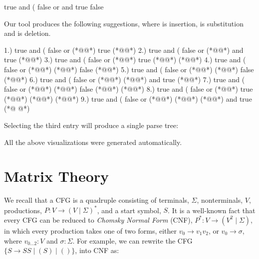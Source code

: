 \documentclass[sigplan,nonacm]{acmart}\settopmatter{printfolios=false,printccs=false,printacmref=false}
\begin{document}
\begin{tidyinput}
true and ( false or and true false
\end{tidyinput}

\noindent Our tool produces the following suggestions, where  is insertion,  is substitution and  is deletion.

\begin{tidyoutput}
1.) true and ( false or (*@\hlorange{!}@*) true (*@\hlorange{)}@*)
2.) true and ( false or (*@@*) and true (*@\hlorange{)}@*)
3.) true and ( false or (*@\hlorange{(}@*) true (*@\hlorange{)}@*) (*@\hlgreen{)}@*)
4.) true and ( false or (*@\hlorange{!}@*) (*@\hlorange{!}@*) false (*@\hlgreen{)}@*)
5.) true and ( false or (*@@*) (*@@*) false (*@\hlgreen{)}@*)
6.) true and ( false or (*@\hlgreen{!}@*) (*@@*) and true (*@\hlorange{)}@*)
7.) true and ( false or (*@\hlorange{!}@*) (*@\hlorange{(}@*) false (*@\hlgreen{)}@*) (*@\hlgreen{)}@*)
8.) true and ( false or (*@\hlorange{!}@*) true (*@\hlorange{)}@*) (*@@*) (*@@*)
9.) true and ( false or (*@\hlgreen{!}@*) (*@@*) (*@\hlgreen{)}@*) and true (*@ @*)
\end{tidyoutput}

\noindent Selecting the third entry will produce a single parse tree:

\begin{figure}[H]
\end{figure}

\noindent All the above visualizations were generated automatically.

\section{Matrix Theory}

We recall that a CFG is a quadruple consisting of terminals, $\Sigma$, nonterminals, $V$, productions, $P: V \rightarrow (V \mid \Sigma)^*$, and a start symbol, $S$. It is a well-known fact that every CFG can be reduced to \textit{Chomsky Normal Form} (CNF), $P^*: V \rightarrow (V^2 \mid \Sigma)$, in which every production takes one of two forms, either $v_0 \rightarrow v_1 v_2$, or $v_0 \rightarrow \sigma$, where $v_{0\ldots2}: V$ and $\sigma: \Sigma$. For example, we can rewrite the CFG $\{S \rightarrow S S \mid ( S ) \mid ()\}$, into CNF as:
\end{document}
